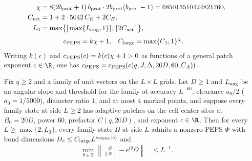 \begin{definition}
\begin{align}
    \end{align}
    \begin{align}
        \chi        & =8(2b_{\rm prot}+1)\,b_{\rm prot}\cdot2b_{\rm prot}(b_{\rm prot}-1)
        =685013510424821760,                                                              \\
        C_{\rm net} & =1+2\cdot5042\,C_E+2C_E,                                            \\
        L_0         & =\max\bigl\{\lceil\max\{L_{\rm ang},1\}\rceil,
        \lceil2C_{\rm net}\rceil\bigr\},
    \end{align}
    \begin{align}
        c_{\rm PEPS}  & =k\chi+1,              &
        C_{\rm large} & =\max\{C_1,1\}^{\chi}.
    \end{align}
    Writing $k(c)$ and $c_{\rm PEPS}(c)=k(c)\chi+1>0$ as functions of a general patch exponent $c\in\R$, one has $c_{\rm PEPS}=c_{\rm PEPS}(c(q,J,\Delta,20D,60,C_A))$.
\end{definition}

\begin{lemma}
    \label{thm:polynomial_peps_of_patch_supply}
    \leanok
    Fix $q\ge2$ and a family of unit vectors on the $L\times L$ grids. Let $D\ge1$ and $L_{\rm ang}$ be an angular slope and threshold for the family at accuracy $L^{-60}$, clearance $a_0/2$ ($a_0=1/5000$), diameter ratio $1$, and at most $4$ marked points, and suppose every family state at side $L\ge2$ has adaptive patches on the cell-center sites at $B_0=20D$, power $60$, prefactor $C(q,20D)$, and exponent $c\in\R$. Then for every $L\ge\max\{2,L_0\}$, every family state $\Omega$ at side $L$ admits a nonzero PEPS $\Phi$ with bond dimensions $D_e\le C_{\rm large}L^{c_{\rm PEPS}(c)}$ and
    \begin{align}
        \min_{\theta\in\mathbb R}
        \left\|\frac{\Phi}{\|\Phi\|}-e^{i\theta}\Omega\right\| & \le L^{-1}.
    \end{align}
\end{lemma}

